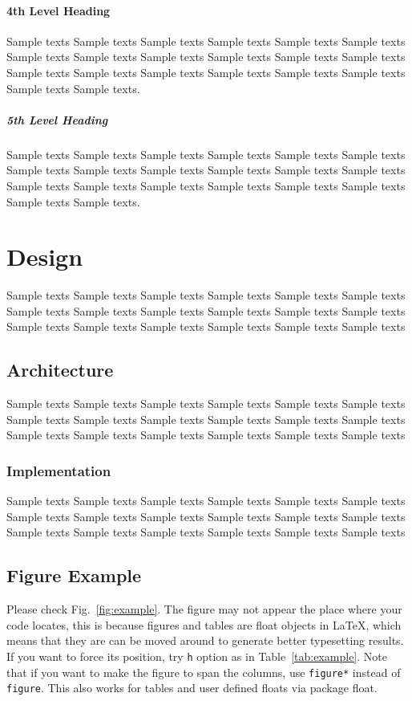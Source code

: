 \documentclass{ics}
\begin{document}
\paragraph{4th Level Heading}
\label{sec:4th-level-heading}
Sample texts Sample texts Sample texts Sample texts Sample texts Sample texts
Sample texts Sample texts Sample texts Sample texts Sample texts Sample texts
Sample texts Sample texts Sample texts Sample texts Sample texts Sample texts
Sample texts Sample texts.

\subparagraph{5th Level Heading}
\label{sec:5th-level-heading}
Sample texts Sample texts Sample texts Sample texts Sample texts Sample texts
Sample texts Sample texts Sample texts Sample texts Sample texts Sample texts
Sample texts Sample texts Sample texts Sample texts Sample texts Sample texts
Sample texts Sample texts.

\section{Design}
\label{sec:design}
Sample texts Sample texts Sample texts Sample texts Sample texts Sample texts
Sample texts Sample texts Sample texts Sample texts Sample texts Sample texts
Sample texts Sample texts Sample texts Sample texts Sample texts Sample texts

\subsection{Architecture}
\label{sec:architecture}
Sample texts Sample texts Sample texts Sample texts Sample texts Sample texts
Sample texts Sample texts Sample texts Sample texts Sample texts Sample texts
Sample texts Sample texts Sample texts Sample texts Sample texts Sample texts

\subsubsection{Implementation}
\label{sec:implementation}
Sample texts Sample texts Sample texts Sample texts Sample texts Sample texts
Sample texts Sample texts Sample texts Sample texts Sample texts Sample texts
Sample texts Sample texts Sample texts Sample texts Sample texts Sample texts

\subsection{Figure Example}
\label{sec:figure-example}
Please check Fig.~\ref{fig:example}. The figure may not appear the place where
your code locates, this is because figures and tables are float objects in
\LaTeX, which means that they are can be moved around to generate better
typesetting results. If you want to force its position, try \texttt{h} option as
in Table~\ref{tab:example}. Note that if you want to make the figure to span the
columns, use \texttt{figure*} instead of \texttt{figure}. This also works for
tables and user defined floats via package \textsf{float}.
\end{document}
